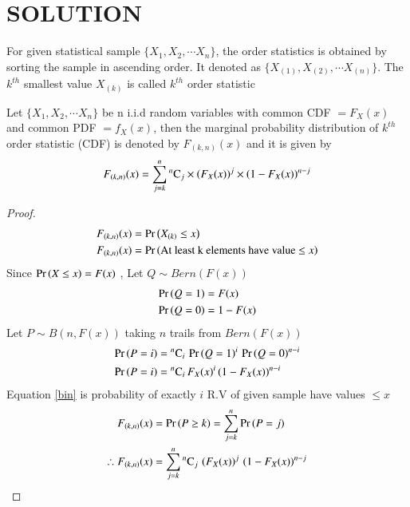 \documentclass[journal,12pt,twocolumn]{IEEEtran}
\begin{document}
\section{SOLUTION}
\begin{definition}
For given statistical sample $\{X_1, X_2,\cdots X_n\}$, the order statistics is obtained by sorting the
sample in ascending order. It denoted as $\{X_{(1)}, X_{(2)},\cdots X_{(n)}\}$. The $k^{th}$ smallest value
$X_{(k)}$ is called  $k^{th}$ order statistic 
\end{definition}
\begin{theorem}
Let $\{X_1, X_2, \cdots X_n\}$ be n i.i.d random variables with common CDF $= F_{X}(x)$ and common PDF $= f_{X}(x)$, 
then the marginal probability distribution of $k^{th}$ order statistic (CDF) is denoted by $F_{(k,n)}(x)$ 
and it is given by
\begin{align}
F_{(k,n)}(x) =  \sum_{j=k}^{n}{}^{n}\mathrm{C}_{j}\times \left(F_{X}(x)\right)^{j}\times\left(1-F_{X}(x)\right)^{n-j} \label{eqn_1}
\end{align}
\label{th1}
\end{theorem}
\begin{proof}
\begin{align}
F_{(k,n)}(x) &= \Pr\left(X_{(k)}\leq x\right) \\
F_{(k,n)}(x) &= \Pr\left(\text{At least k elements have value $\leq x$}\right) \label{kcdf}
\end{align}
Since $\Pr\left(X\leq x\right) = F(x)$ , Let $ Q \sim Bern(F(x))$
\begin{align}
\Pr\left(Q=1\right) &= F(x) \\
\Pr\left(Q=0\right) &= 1-F(x)
\end{align}
Let $P \sim B(n,F(x))$ taking $n$ trails from $Bern(F(x))$    
\begin{align}
\Pr\left(P=i\right) &= {}^{n}\mathrm{C}_{i}\,\Pr\left(Q=1\right)^{i}\,\Pr\left(Q=0\right)^{n-i} \\
\Pr\left(P=i\right) &= {}^{n}\mathrm{C}_{i}\,F_{X}(x)^{i}\,(1-F_{X}(x))^{n-i}\label{bin}  
\end{align}
Equation \eqref{bin} is probability of exactly $i$ R.V of given sample have values $\leq x$   
\begin{align}
 F_{(k,n)}(x) &= \Pr\left(P\geq k\right) =  \sum_{j=k}^{n} \Pr\left(P=j\right) \\
\therefore F_{(k,n)}(x) &=  \sum_{j=k}^{n}{}^{n}\mathrm{C}_{j}\, \left(F_{X}(x)\right)^{j}\,\left(1-F_{X}(x)\right)^{n-j} 
\end{align}
\end{proof}
\end{document}
